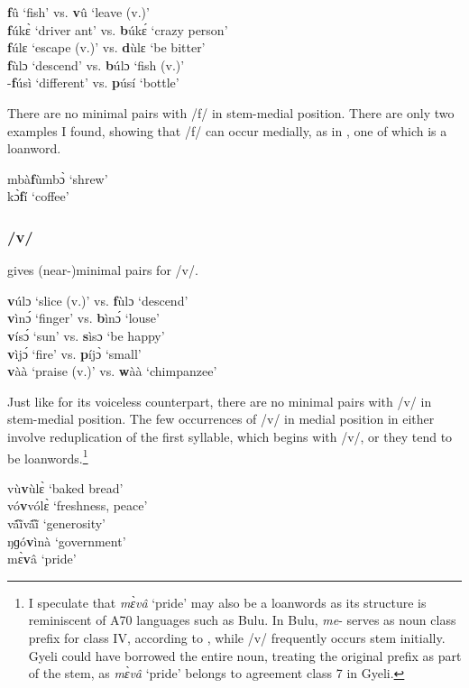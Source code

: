 \ea \label{f}
{\bfseries f}û `fish' vs. {\bfseries v}û `leave (v.)' \\
{\bfseries f}úkɛ̀ `driver ant' vs. {\bfseries b}úkɛ́ `crazy person' \\
{\bfseries f}úlɛ `escape (v.)' vs. {\bfseries d}ùlɛ `be bitter' \\
{\bfseries f}ùlɔ `descend' vs. {\bfseries b}úlɔ `fish (v.)' \\
-{\bfseries f}úsì `different' vs. {\bfseries p}úsí `bottle'
\z

\noindent There are no minimal pairs with /f/ in stem-medial position. There are only two examples I found, showing that /f/ can occur medially, as in , one of which is a loanword. 

\ea \label{fm}
mbà{\bfseries f}ùmbɔ̀ `shrew'\\
kɔ̀{\bfseries f}í `coffee'
\z

\subsubsection*{\bfseries /v/}  gives (near-)minimal pairs for /v/.

\ea \label{v}
{\bfseries v}úlɔ `slice (v.)' vs. {\bfseries f}ùlɔ `descend' \\
{\bfseries v}ìnɔ́ `finger' vs. {\bfseries b}ìnɔ́ `louse' \\
{\bfseries v}ísɔ́ `sun' vs. {\bfseries s}ìsɔ `be happy' \\
{\bfseries v}ìjɔ́ `fire' vs. {\bfseries p}íjɔ̀ `small' \\
{\bfseries v}àà `praise (v.)' vs.  {\bfseries w}àà `chimpanzee'
\z

\noindent Just like for its voiceless counterpart, there are no minimal pairs with /v/ in stem-medial position. The few occurrences of /v/ in medial position in  either involve reduplication of the first syllable, which begins with /v/, or they tend to be loanwords.\footnote{I speculate that {\it mɛ̀vâ} `pride' may also be a loanwords as its structure is reminiscent of A70 languages such as Bulu. In Bulu, {\it me}- serves as noun class prefix for class IV, according to \citet{bates04}, while /v/ frequently occurs stem initially. Gyeli could have borrowed the entire noun, treating the original prefix as part of the stem, as {\itshape mɛ̀vâ} `pride' belongs to agreement class 7 in Gyeli.}

\ea \label{vm}
vù{\bfseries v}ùlɛ̀ `baked bread'\\
vó{\bfseries v}vólɛ̀ `freshness, peace'\\
vã́ĩ̀{v}ã́ĩ̀ `generosity' \\
ŋɡó{\bfseries v}ìnà `government' \\
mɛ̀{\bfseries v}â `pride'
\z

